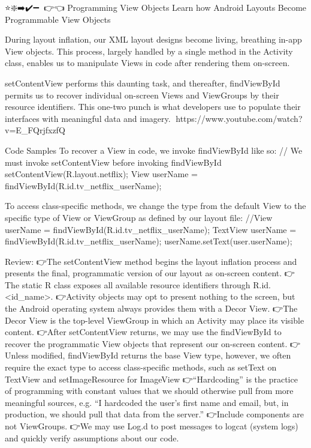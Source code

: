 ⭐❇️➡️✔️➖🔗💎👉👈
Programming View Objects
        Learn how Android Layouts Become Programmable View Objects

        During layout inflation, our XML layout designs become living, breathing in-app View objects. This process, largely handled by a single method in the Activity class, enables us to manipulate Views in code after rendering them on-screen.

        setContentView performs this daunting task, and thereafter, findViewById permits us to recover individual on-screen Views and ViewGroups by their resource identifiers. This one-two punch is what developers use to populate their interfaces with meaningful data and imagery.
            🔗https://www.youtube.com/watch?v=E_FQrjfxzfQ

    Code Samples
        To recover a View in code, we invoke findViewById like so:
            // We must invoke setContentView before invoking findViewById
            setContentView(R.layout.netflix);
            View userName = findViewById(R.id.tv_netflix_userName);

        To access class-specific methods, we change the type from the default View to the specific type of View or ViewGroup as defined by our layout file:
            //View userName = findViewById(R.id.tv_netflix_userName);
            TextView userName = findViewById(R.id.tv_netflix_userName);
            userName.setText(user.userName);

        Review:
            👉The setContentView method begins the layout inflation process and presents the final, programmatic version of our layout as on-screen content.
            👉The static R class exposes all available resource identifiers through R.id.<id_name>.
            👉Activity objects may opt to present nothing to the screen, but the Android operating system always provides them with a Decor View.
            👉The Decor View is the top-level ViewGroup in which an Activity may place its visible content.
            👉After setContentView returns, we may use the findViewById to recover the programmatic View objects that represent our on-screen content.
            👉Unless modified, findViewById returns the base View type, however, we often require the exact type to access class-specific methods, such as setText on TextView and setImageResource for ImageView
            👉“Hardcoding” is the practice of programming with constant values that we should otherwise pull from more meaningful sources, e.g. “I hardcoded the user’s first name and email, but, in production, we should pull that data from the server.”
            👉Include components are not ViewGroups.
            👉We may use Log.d to post messages to logcat (system logs) and quickly verify assumptions about our code.

